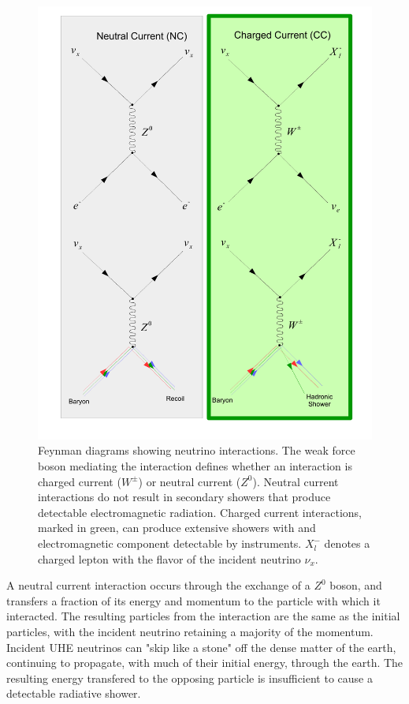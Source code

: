 \begin{figure}
	\centering
	\includegraphics[height=0.85\textheight]{figures/NC_CC}
	\caption{Feynman diagrams showing neutrino interactions.  The weak force boson mediating the interaction defines whether an interaction is charged current ($W^{\pm}$) or neutral current ($Z^{0}$).  Neutral current interactions do not result in secondary showers that produce detectable electromagnetic radiation.  Charged current interactions, marked in green, can produce extensive showers with and electromagnetic component detectable by instruments.  $X^{-}_{l}$ denotes a charged lepton with the flavor of the incident neutrino $\nu_{x}$.}
	\label{fig:NC_CC}
\end{figure}

	
		A neutral current interaction occurs through the exchange of a $Z^{0}$ boson, and transfers a fraction of its energy and momentum to the particle with which it interacted.  The resulting particles from the interaction are the same as the initial particles, with the incident neutrino retaining a majority of the momentum.  Incident UHE neutrinos can "skip like a stone" off the dense matter of the earth, continuing to propagate, with much of their initial energy, through the earth.  The resulting energy transfered to the opposing particle is insufficient to cause a detectable radiative shower.
		
